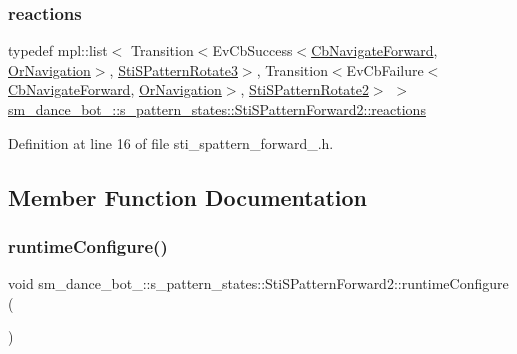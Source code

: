 \subsubsection{\texorpdfstring{reactions}{reactions}}
{\footnotesize\ttfamily typedef mpl\+::list$<$ Transition$<$Ev\+Cb\+Success$<$\hyperlink{classcl__move__base__z_1_1CbNavigateForward}{Cb\+Navigate\+Forward}, \hyperlink{classsm__dance__bot__2_1_1OrNavigation}{Or\+Navigation}$>$, \hyperlink{structsm__dance__bot__2_1_1s__pattern__states_1_1StiSPatternRotate3}{Sti\+S\+Pattern\+Rotate3}$>$, Transition$<$Ev\+Cb\+Failure$<$\hyperlink{classcl__move__base__z_1_1CbNavigateForward}{Cb\+Navigate\+Forward}, \hyperlink{classsm__dance__bot__2_1_1OrNavigation}{Or\+Navigation}$>$, \hyperlink{structsm__dance__bot__2_1_1s__pattern__states_1_1StiSPatternRotate2}{Sti\+S\+Pattern\+Rotate2}$>$ $>$ \hyperlink{structsm__dance__bot__2_1_1s__pattern__states_1_1StiSPatternForward2_ae4c9543a69f845df49a6dc920b75a4a9}{sm\+\_\+dance\+\_\+bot\+\_\+::s\+\_\+pattern\+\_\+states\+::\+Sti\+S\+Pattern\+Forward2\+::reactions}}



Definition at line 16 of file sti\+\_\+spattern\+\_\+forward\+\_.\+h.



\subsection{Member Function Documentation}
\mbox{\label{structsm__dance__bot__2_1_1s__pattern__states_1_1StiSPatternForward2_a3fc96e9dc621b87bea5a6001ee556ae0}} 
\subsubsection{\texorpdfstring{runtime\+Configure()}{runtimeConfigure()}}
{\footnotesize\ttfamily void sm\+\_\+dance\+\_\+bot\+\_\+::s\+\_\+pattern\+\_\+states\+::\+Sti\+S\+Pattern\+Forward2\+::runtime\+Configure (\begin{DoxyParamCaption}{ }\end{DoxyParamCaption})\hspace{0.3cm}{\ttfamily [inline]}}



